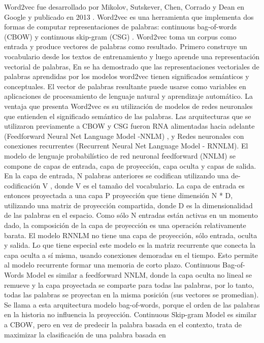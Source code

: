 Word2vec fue desarrollado por Mikolov, Sutskever, Chen, Corrado y Dean en Google
y publicado en 2013 \cite{mikolov2013efficient}. Word2vec es una herramienta que implementa
dos formas de computar representaciones de palabras: continuous bag-of-words
(CBOW) y continuous skip-gram (CSG) .
Word2vec toma un corpus como entrada y produce vectores de palabras como resultado.
Primero construye un vocabulario desde los textos de entrenamiento y luego
aprende una representación vectorial de palabras, En \cite{goldberg2014word2vec} se ha demostrado que las representaciones vectoriales de palabras aprendidas
por los modelos word2vec tienen significados semánticos y conceptuales. El vector de palabras resultante puede
usarse como variables en aplicaciones de procesamiento de lenguaje natural y aprendizaje automático.
La ventaja que presenta Word2vec es su utilización de modelos de redes neuronales que
entienden el significado semántico de las palabras.
Las arquitecturas que se utilizaron previamente a CBOW y CSG fueron RNA alimentadas
hacia adelante (Feedforward Neural Net Language Model -NNLM) , y Redes
neuronales con conexiones recurrentes (Recurrent Neural Net Language Model -
RNNLM).
El modelo de lenguaje probabilístico de red neuronal feedforward (NNLM) se compone
de capas de entrada, capa de proyección, capa oculta y capas de salida. En la
capa de entrada, N palabras anteriores se codifican utilizando una de-codificación V ,
donde V es el tamaño del vocabulario. La capa de entrada es entonces proyectada a
una capa P proyección que tiene dimensión N * D, utilizando una matriz de proyección
compartida, donde D es la dimensionalidad de las palabras en el espacio. Como sólo N
entradas están activas en un momento dado, la composición de la capa de proyección
es una operación relativamente barata.
El modelo RNNLM no tiene una capa de proyección, sólo entrada, oculta y salida.
Lo que tiene especial este modelo es la matriz recurrente que conecta la capa oculta a
sí misma, usando conexiones demoradas en el tiempo. Esto permite al modelo recurrente
formar una memoria de corto plazo.
Continuous Bag-of-Words Model es similar a feedforward NNLM, donde la capa
oculta no lineal se remueve y la capa proyectada se comparte para todas las palabras,
por lo tanto, todas las palabras se proyectan en la misma posición (sus vectores se
promedian). Se llama a esta arquitectura modelo bag-of-words, porque el orden de las
palabras en la historia no influencia la proyección.
Continuous Skip-gram Model es similar a CBOW, pero en vez de predecir la palabra
basada en el contexto, trata de maximizar la clasificación de una palabra basada en
